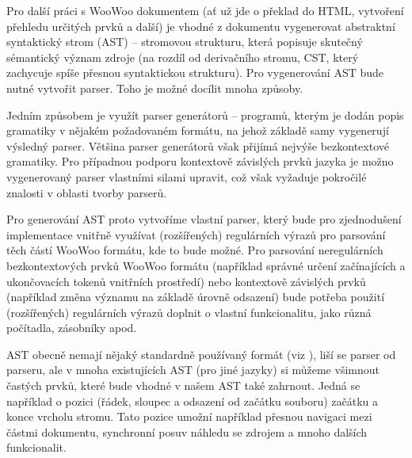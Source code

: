 Pro další práci s WooWoo dokumentem (ať už jde o překlad do HTML, vytvoření přehledu určitých prvků a další) je vhodné z
dokumentu vygenerovat abstraktní syntaktický strom (AST) – stromovou strukturu, která popisuje skutečný sémantický
význam zdroje (na rozdíl od derivačního stromu, CST, který zachycuje spíše přesnou syntaktickou strukturu). Pro
vygenerování AST bude nutné vytvořit parser. Toho je možné docílit mnoha způsoby.

Jedním způsobem je využít parser generátorů – programů, kterým je dodán popis gramatiky v nějakém požadovaném formátu,
na jehož základě samy vygenerují výsledný parser. Většina parser generátorů však přijímá nejvýše bezkontextové
gramatiky. Pro případnou podporu kontextově závislých prvků jazyka je možno vygenerovaný parser vlastními silami
upravit, což však vyžaduje pokročilé znalosti v oblasti tvorby parserů.

Pro generování AST proto vytvoříme vlastní parser, který bude pro zjednodušení implementace vnitřně využívat
(rozšířených) regulárních výrazů pro parsování těch částí WooWoo formátu, kde to bude možné. Pro parsování neregulárních
bezkontextových prvků WooWoo formátu (například správné určení začínajících a ukončovacích tokenů vnitřních prostředí)
nebo kontextově závislých prvků (například změna významu na základě úrovně odsazení) bude potřeba použití (rozšířených)
regulárních výrazů doplnit o vlastní funkcionalitu, jako různá počítadla, zásobníky apod.

AST obecně nemají nějaký standardně používaný formát (viz \cite{ast-explorer}), liší se parser od parseru, ale v mnoha
existujících AST (pro jiné jazyky) si můžeme všimnout častých prvků, které bude vhodné v našem AST také zahrnout. Jedná
se například o pozici (řádek, sloupec a odsazení od začátku souboru) začátku a konce vrcholu stromu. Tato pozice umožní
například přesnou navigaci mezi částmi dokumentu, synchronní posuv náhledu se zdrojem a mnoho dalších funkcionalit.
